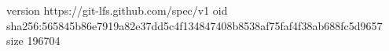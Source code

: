 version https://git-lfs.github.com/spec/v1
oid sha256:565845b86e7919a82e37dd5c4f134847408b8538af75faf4f38ab688fc5d9657
size 196704
